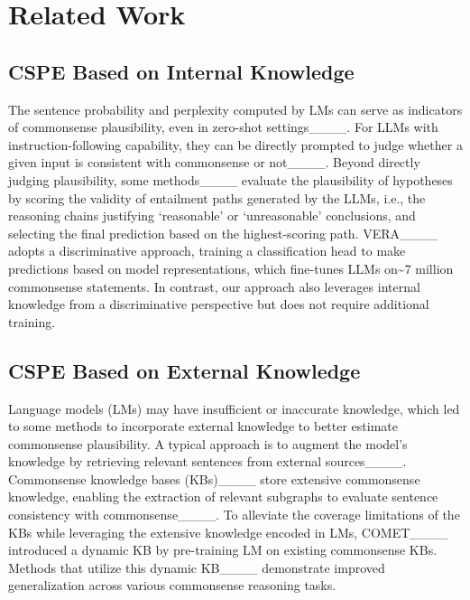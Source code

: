 \section{Related Work}
\subsection{CSPE Based on Internal Knowledge}

The sentence probability and perplexity computed by LMs can serve as indicators of commonsense plausibility, even in zero-shot settings____. For LLMs with instruction-following capability, they can be directly prompted to judge whether a given input is consistent with commonsense or not____. Beyond directly judging plausibility, some methods____ evaluate the plausibility of hypotheses by scoring the validity of entailment paths generated by the LLMs, i.e., the reasoning chains justifying `reasonable' or `unreasonable' conclusions, and selecting the final prediction based on the highest-scoring path. VERA____ adopts a discriminative approach, training a classification head to make predictions based on model representations, which fine-tunes LLMs on\textasciitilde7 million commonsense statements. In contrast, our approach also leverages internal knowledge from a discriminative perspective but does not require additional training.

\subsection{CSPE Based on External Knowledge}

Language models (LMs) may have insufficient or inaccurate knowledge, which led to some methods to incorporate external knowledge to better estimate commonsense plausibility. A typical approach is to augment the model's knowledge by retrieving relevant sentences from external sources____. Commonsense knowledge bases (KBs)____ store extensive commonsense knowledge, enabling the extraction of relevant subgraphs to evaluate sentence consistency with commonsense____. To alleviate the coverage limitations of the KBs while leveraging the extensive knowledge encoded in LMs, COMET____ introduced a dynamic KB by pre-training LM on existing commonsense KBs. Methods that utilize this dynamic KB____ demonstrate improved generalization across various commonsense reasoning tasks.